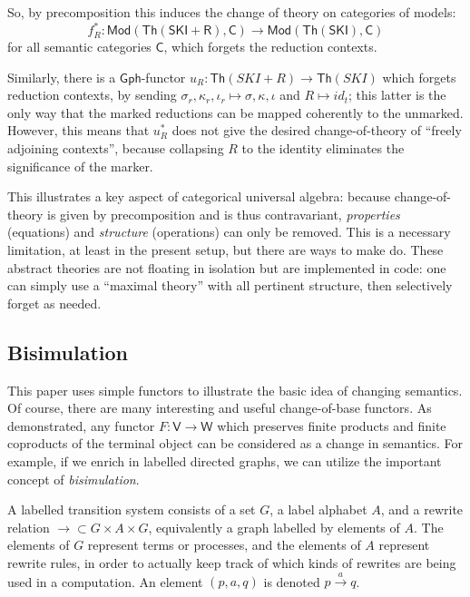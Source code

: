 \documentclass{amsart}
\theoremstyle{definition}
\newcommand{\Th}{\mathsf{Th}}
\newcommand{\Gph}{\mathsf{Gph}}
\newcommand{\Mod}{\mathsf{Mod}}
\newcommand{\V}{\mathsf{V}}
\newcommand{\W}{\mathsf{W}}
\newcommand{\C}{\mathsf{C}}
\newcommand{\maps}{\colon}
\begin{document}
So, by precomposition this induces the change of theory on categories of models: 
\[   f_R^*\maps \Mod(\Th(\mathsf{SKI} + \mathsf{R}),\C) \to \Mod(\Th(\mathsf{SKI}),\C) \]
for all semantic categories $\C$, which forgets the reduction contexts.

Similarly, there is a $\Gph$-functor $u_R\maps \Th(SKI+R)\to \Th(SKI)$ which forgets reduction contexts, by sending $\sigma_r,\kappa_r,\iota_r \mapsto\sigma, \kappa,\iota$ and $R \mapsto id_t$; this latter is the only way that the marked reductions can be mapped coherently to the unmarked. However, this means that $u_R^*$ does not give the desired change-of-theory of ``freely adjoining contexts'', because collapsing $R$ to the identity eliminates the significance of the marker.

This illustrates a key aspect of categorical universal algebra: because change-of-theory is given by precomposition and is thus contravariant, \textit{properties} (equations) and \textit{structure} (operations) can only be removed. This is a necessary limitation, at least in the present setup, but there are ways to make do. These abstract theories are not floating in isolation but are implemented in code: one can simply use a ``maximal theory'' with all pertinent structure, then selectively forget as needed.

\subsection{Bisimulation}
\label{ssec:bisimulation}

This paper uses simple functors to illustrate the basic idea of changing semantics. Of course, there are many interesting and useful change-of-base functors. As demonstrated, any functor $F\maps \V\to \W$ which preserves finite products and finite coproducts of the terminal object can be considered as a change in semantics. For example, if we enrich in labelled directed graphs, we can utilize the important concept of \textit{bisimulation}.

A labelled transition system consists of a set $G$, a label alphabet $A$, and a rewrite relation $\rightarrow \subset G\times A\times G$, equivalently a graph labelled by elements of $A$. The elements of $G$ represent terms or processes, and the elements of $A$ represent rewrite rules, in order to actually keep track of which kinds of rewrites are being used in a computation. An element $(p,a,q)$ is denoted $p\xrightarrow{a} q$.
\end{document}
